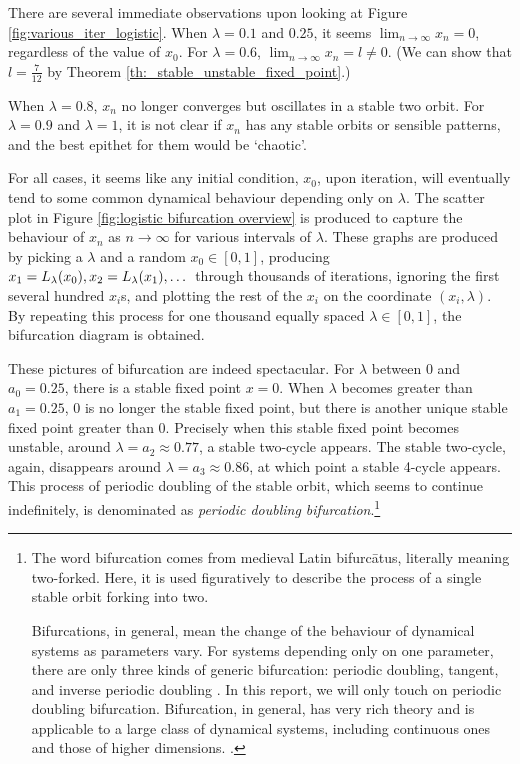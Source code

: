 There are several immediate observations upon looking at Figure \ref{fig:various_iter_logistic}.
When $\lambda = 0.1$ and $0.25$, it seems $\lim_{n \rightarrow \infty} x_n = 0$, regardless of the value of $x_0$.
For $\lambda = 0.6$, $\lim_{n \rightarrow \infty} x_n = l \neq 0$. 
(We can show that $l = \frac{7}{12}$ by Theorem \ref{th:_stable_unstable_fixed_point}.)

When $\lambda = 0.8$, $x_n$ no longer converges but oscillates in a stable two orbit. 
For $\lambda = 0.9$ and $\lambda = 1$, it is not clear if $x_n$ has any stable orbits or sensible patterns, and the best epithet for them would be `chaotic'.

For all cases, it seems like any initial condition, $x_0$, upon iteration, will eventually tend to some common dynamical behaviour depending only on $\lambda$.
The scatter plot in Figure \ref{fig:logistic bifurcation overview} is produced to capture the behaviour of $x_n$ as $n \rightarrow \infty$ for various intervals of $\lambda$.
These graphs are produced by picking a $\lambda$ and a random $x_0 \in [0,1]$, producing $x_{1} = L_{\lambda}(x_0), x_{2} = L_{\lambda}(x_1), \dots$ through thousands of iterations, ignoring the first several hundred $x_i$s, and plotting the rest of the $x_i$ on the coordinate $(x_i, \lambda)$. 
By repeating this process for one thousand equally spaced $\lambda \in [0,1]$, the bifurcation diagram is obtained.

These pictures of bifurcation are indeed spectacular. 
For $\lambda$ between $0$ and $a_0 = 0.25$, there is a stable fixed point $x = 0$.
When $\lambda$ becomes greater than $a_1 = 0.25$, $0$ is no longer the stable fixed point, but there is another unique stable fixed point greater than $0$.
Precisely when this stable fixed point becomes unstable, around $\lambda = a_2 \approx 0.77$, a stable two-cycle appears.
The stable two-cycle, again, disappears around $\lambda = a_3 \approx 0.86$, at which point a stable 4-cycle appears. 
This process of periodic doubling of the stable orbit, which seems to continue indefinitely, is denominated as \emph{periodic doubling bifurcation}.\footnote{
	The word bifurcation comes from medieval Latin bifurcātus, literally meaning two-forked. Here, it is used figuratively to describe the process of a single stable orbit forking into two.
	
	Bifurcations, in general, mean the change of the behaviour of dynamical systems as parameters vary.
	For systems depending only on one parameter, there are only three kinds of generic bifurcation: periodic doubling, tangent, and inverse periodic doubling \cite{Chaos_in_DS}.
	In this report, we will only touch on periodic doubling bifurcation.
	Bifurcation, in general, has very rich theory and is applicable to a large class of dynamical systems, including continuous ones and those of higher dimensions. \cite{dynamical_systems_v}.
}

